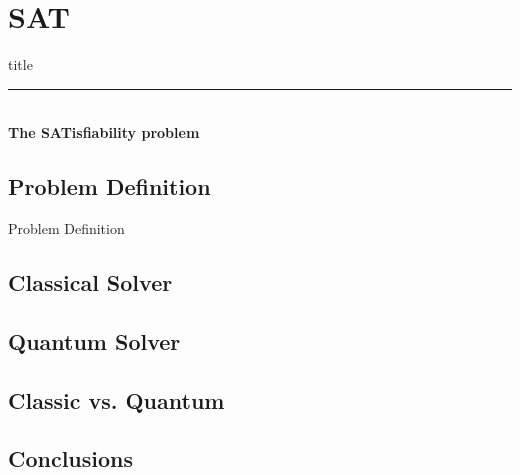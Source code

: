 \section{SAT}

	\begin{frame}[plain]
		\vfill
		\centering
		\begin{beamercolorbox}[sep=8pt,center,shadow=true,rounded=true]{title}
			\textbf{\insertsectionhead}\par%
			\color{polimiblue}\noindent\rule{10cm}{1pt} \\
			\textbf{The SATisfiability problem}
		\end{beamercolorbox}
		\vfill
	\end{frame}

	\subsection{Problem Definition}
		\begin{frame}{Problem Definition}
			 
		\end{frame}
	
	\subsection{Classical Solver}
		
	
	\subsection{Quantum Solver}
			
	
	\subsection{Classic vs. Quantum}
		
		
	\subsection{Conclusions}
		
		
	